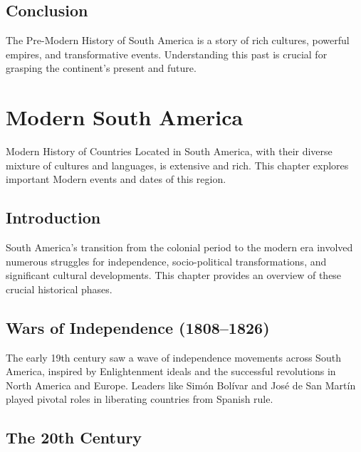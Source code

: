 \documentclass[a4paper,12pt]{book}
\begin{document}
\section{Conclusion}
\label{sec:conclusion-pre-modern-south-america}
The Pre-Modern History of South America is a story of rich cultures, powerful empires, and transformative events. Understanding this past is crucial for grasping the continent’s present and future.

\chapter{Modern South America}
\label{ch:modern-history-south-america}

Modern History of Countries Located in South America, with their diverse mixture of cultures and languages, is extensive and rich. This chapter explores important Modern events and dates of this region.

\section{Introduction}
\label{sec:introduction-modern-south-america}
South America's transition from the colonial period to the modern era involved numerous struggles for independence, socio-political transformations, and significant cultural developments. This chapter provides an overview of these crucial historical phases.

\section{Wars of Independence (1808–1826)}
\label{sec:wars-of-independence}
The early 19th century saw a wave of independence movements across South America, inspired by Enlightenment ideals and the successful revolutions in North America and Europe. Leaders like Simón Bolívar and José de San Martín played pivotal roles in liberating countries from Spanish rule.

\section{The 20th Century}
\label{sec:20th-century}
\end{document}
